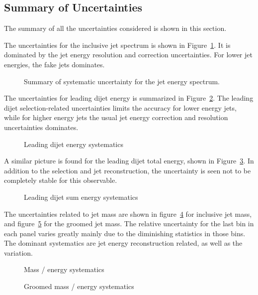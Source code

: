 \subsection{Summary of Uncertainties}

The summary of all the uncertainties considered is shown in this section.

The uncertainties for the inclusive jet spectrum is shown in Figure~\ref{Figure:Systematics-JetE}.  It is dominated by the jet energy resolution and correction uncertainties.  For lower jet energies, the fake jets dominates.
%
\begin{figure}[htp!]
    \centering
    \caption{Summary of systematic uncertainty for the jet energy spectrum.}
    \label{Figure:Systematics-JetE}
\end{figure}

The uncertainties for leading dijet energy is summarized in Figure~\ref{Figure:Systematics-DiJetE}.  The leading dijet selection-related uncertainties limits the accuracy for lower energy jets, while for higher energy jets the usual jet energy correction and resolution uncertainties dominates.
%
\begin{figure}[htp!]
    \centering
    \caption{Leading dijet energy systematics}
    \label{Figure:Systematics-DiJetE}
\end{figure}

A similar picture is found for the leading dijet total energy, shown in Figure~\ref{Figure:Systematics-DiJetSum}.  In addition to the selection and jet reconstruction, the \SVD uncertainty is seen not to be completely stable for this observable.
%
\begin{figure}[htp!]
    \centering
    \caption{Leading dijet sum energy systematics}
    \label{Figure:Systematics-DiJetSum}
\end{figure}

The uncertainties related to jet mass are shown in figure~\ref{Figure:Systematics-JetME} for inclusive jet mass, and figure~\ref{Figure:Systematics-JetMGE} for the groomed jet mass.  The relative uncertainty for the last bin in each panel varies greatly mainly due to the diminishing statistics in those bins.  The dominant systematics are jet energy reconstruction related, as well as the \SVD variation.
%
\begin{figure}[htp!]
    \centering
    \caption{Mass / energy systematics}
    \label{Figure:Systematics-JetME}
\end{figure}
%
\begin{figure}[htp!]
    \centering
    \caption{Groomed mass / energy systematics}
    \label{Figure:Systematics-JetMGE}
\end{figure}

